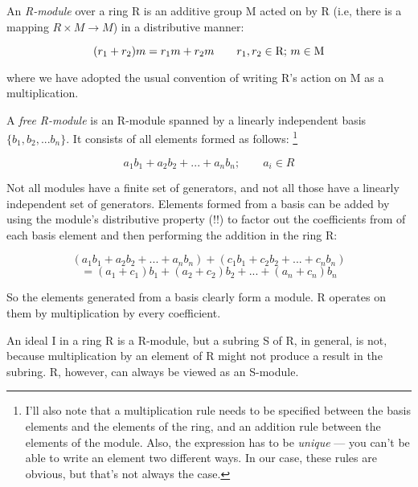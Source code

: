 
An {\it R-module} over a ring R is an additive group M acted on by R
(i.e, there is a mapping $R \times M \to M$) in a distributive manner:

$$(r_1 + r_2)m = r_1 m + r_2 m \qquad r_1, r_2 \in {\rm R};\, m \in {\rm M}$$

where we have adopted the usual convention of writing R's action on M
as a multiplication.

\enddefinition


A {\it free R-module} is an R-module spanned by a linearly independent basis
$\{b_1, b_2, ... b_n\}$.  It consists of all elements formed as follows:
\footnote{I'll also note that a multiplication rule needs to be specified
between the basis elements and the elements of the ring, and an
addition rule between the elements of the module.  Also,
the expression has to be {\it unique} --- you can't be
able to write an element two different ways.  In our
case, these rules are obvious, but that's not always the case.}

	$$ a_1 b_1 + a_2 b_2 + ... + a_n b_n; \qquad a_i \in R $$


\enddefinition

Not all modules have a finite set of generators, and not all those
have a linearly independent set of generators.  Elements formed from a
basis can be added by using the module's distributive property (!!) to
factor out the coefficients from of each basis element and then
performing the addition in the ring R:

$$ (a_1 b_1 + a_2 b_2 + ... + a_n b_n) + (c_1 b_1 + c_2 b_2 + ... + c_n b_n) $$
$$  = (a_1 + c_1) b_1 + (a_2 + c_2) b_2 + ... + (a_n + c_n) b_n $$

So the elements generated from a basis clearly form a module.  R operates
on them by multiplication by every coefficient.

\example \quad
\label{sample modules}

An ideal I in a ring R is a R-module, but a subring S of R, in
general, is not, because multiplication by an element of R might not
produce a result in the subring.  R, however, can always be viewed as
an S-module.

%

